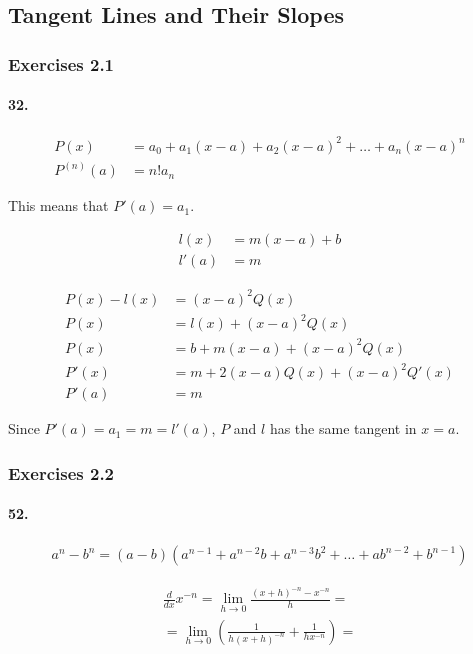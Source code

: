 \subsection{Tangent Lines and Their Slopes}

\subsubsection{Exercises 2.1}

\paragraph{32.}

\begin{align*}
	P(x) &= a_0 + a_1(x-a) + a_2(x-a)^2 + \hdots + a_n(x-a)^n \\
	P^{(n)}(a) &= n!a_n 
\end{align*}

This means that $P'(a)=a_1$.

\begin{align*}
	l(x) &= m(x-a)+b \\
	l'(a) &= m
\end{align*}

\begin{align*}
	P(x)-l(x) &= (x-a)^2Q(x) \\
	P(x) &= l(x) + (x-a)^2Q(x) \\
	P(x) &= b + m(x-a) + (x-a)^2Q(x) \\
	P'(x) &= m + 2(x-a)Q(x) + (x-a)^2Q'(x) \\
	P'(a) &= m
\end{align*}

Since $P'(a)=a_1=m=l'(a)$, $P$ and $l$ has the same tangent in $x=a$.

\subsubsection{Exercises 2.2}

\paragraph{52.}

\begin{align*}
	a^n-b^n = (a-b)(a^{n-1}+a^{n-2}b+a^{n-3}b^2+\hdots+ab^{n-2}+b^{n-1})
\end{align*}


\begin{align*}
	\frac{d}{dx}x^{-n} = \lim_{h\rightarrow 0} \frac{(x+h)^{-n}-x^{-n}}{h} = \\
	= \lim_{h\rightarrow 0} \left(\frac{1}{h(x+h)^{-n}}+\frac{1}{hx^{-n}}\right) = \\
\end{align*}


